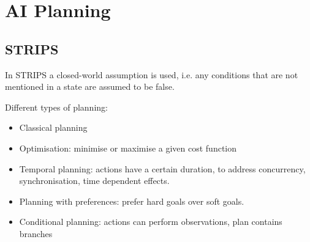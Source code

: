\section{AI Planning}\label{sec:AI Planning}

\subsection{STRIPS}\label{subsec:STRIPS}
In STRIPS a closed-world assumption is used, i.e. any conditions that are not mentioned in a state are assumed to be false.

Different types of planning: \cite{ROSplanAAAI17tutorial}
\begin{itemize}
    \item Classical planning
    \item Optimisation: minimise or maximise a given cost function
    \item Temporal planning: actions have a certain duration, to address concurrency, synchronisation, time dependent effects.
    \item Planning with preferences: prefer hard goals over soft goals.
    \item Conditional planning: actions can perform observations, plan contains branches
\end{itemize}